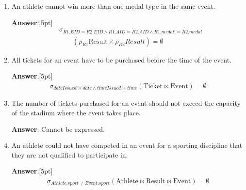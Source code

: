 \documentclass{article}
\begin{document}
\begin{enumerate}

\item   %
An athlete cannot win more than one medal type in the same event.


{\bf Answer}:[5pt]
\begin{equation*}
\begin{aligned}
& \sigma_{R1.EID=R2.EID \land R1.AID=R2.AID \land R1.medal != R2.medal} \\
&    \quad \quad (\rho_{R1} \mathrm{Result} \times \rho_{R2} Result) = \emptyset
\end{aligned}
\end{equation*}

\item   %
All tickets for an event have to be purchased before the time of the event.

{\bf Answer}:[5pt]
\begin{equation*}
\begin{aligned}
\sigma_{dateIssued \geq date \land timeIssued \geq time} (\mathrm{Ticket} \bowtie \mathrm{Event}) = \emptyset
\end{aligned}
\end{equation*}


\item   %
The number of tickets purchased for an event should not exceed the capacity
of the stadium where the event takes place.

{\bf Answer}: Cannot be expressed.

\item   %
An athlete could not have competed in an event for a sporting discipline
that they are not qualified to participate in.

{\bf Answer}:[5pt]
\begin{equation*}
\begin{aligned}
\sigma_{Athlete.sport \neq Event.sport} (\mathrm{Athlete} \bowtie \mathrm{Result} \bowtie \mathrm{Event}) = \emptyset
\end{aligned}
\end{equation*}


\end{enumerate}
\end{document}
